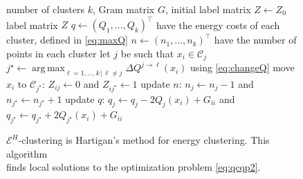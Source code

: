 \documentclass[aps,preprint,nofootinbib,floatfix]{revtex4-1}
\DeclareMathOperator*{\argmax}{arg\,max}
\newcommand\C{{\mathcal{C}}}
\begin{document}
\begin{figure}
\begin{flushleft}
\begin{algorithm}[H]
\vspace{.5em}
\begin{algorithmic}[1]
    \INPUT number of clusters $k$, Gram matrix $G$, 
                initial label matrix $Z \leftarrow Z_0$
    \OUTPUT label matrix $Z$
  \STATE $q \leftarrow (Q_1, \dotsc, Q_k)^\top$ 
            have the energy costs of each cluster, defined in \eqref{eq:maxQ}
  \STATE $n \leftarrow (n_1,\dotsc,n_k)^\top$ have the number of points 
        in each cluster%
  \REPEAT
        \STATE let $j$ be such that $x_i \in \C_j$
        \STATE $j^\star \leftarrow \argmax_{\ell=1,\dotsc,k \, | \, \ell\ne j} 
                \Delta Q^{j\to \ell}(x_i)$
            using \eqref{eq:changeQ} \label{stepmove}
            \STATE move $x_i$ to $\C_{j^\star}$: $Z_{ij} \leftarrow 0$ and 
            $Z_{ij^\star} \leftarrow 1$
            \STATE update $n$: $n_j \leftarrow n_j - 1$ and
                    $n_{j^\star} \leftarrow n_{j^\star} + 1$
            \STATE update $q$: $q_j \leftarrow q_j - 2Q_j(x_i) + G_{ii}$ and
    $q_{j^\star} \leftarrow q_{j^\star} + 2Q_{j^\star}(x_i)+ G_{ii}$
        \ENDIF
    \ENDFOR
\end{algorithmic}
\caption{\label{algo}
$\mathcal{E}^H$-clustering is Hartigan's method for energy clustering.
This algorithm~~~~~~ \\ finds local solutions to  
the optimization problem \eqref{eq:qcqp2}.\hspace{\fill}
\hspace{\fill}
}
\end{algorithm}
\end{flushleft}
\end{figure}
\end{document}
